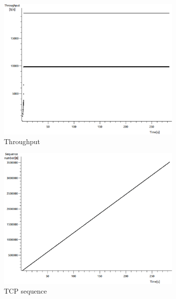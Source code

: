 \documentclass[conference,a4paper]{../../sty/IEEEtran}
\begin{document}
\begin{figure}
 \centering
 \begin{subfigure}[b]{0.2\textwidth}
  \includegraphics[width=\textwidth]{s4-2_thru}
  \caption{Throughput}
 \end{subfigure}
 \begin{subfigure}[b]{0.2\textwidth}
  \includegraphics[width=\textwidth]{s4-2_seq}
  \caption{TCP sequence}
 \end{subfigure}
 \begin{subfigure}[b]{0.2\textwidth}

\end{subfigure}
\end{figure}
\end{document}
